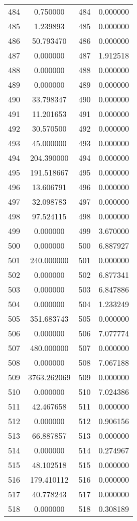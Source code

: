 \documentclass[12pt]{article}
\begin{document}
\begin{longtable}{@{}cccc@{}}
484 & 0.750000 & 484 & 0.000000 \\
485 & 1.239893 & 485 & 0.000000 \\
486 & 50.793470 & 486 & 0.000000 \\
487 & 0.000000 & 487 & 1.912518 \\
488 & 0.000000 & 488 & 0.000000 \\
489 & 0.000000 & 489 & 0.000000 \\
490 & 33.798347 & 490 & 0.000000 \\
491 & 11.201653 & 491 & 0.000000 \\
492 & 30.570500 & 492 & 0.000000 \\
493 & 45.000000 & 493 & 0.000000 \\
494 & 204.390000 & 494 & 0.000000 \\
495 & 191.518667 & 495 & 0.000000 \\
496 & 13.606791 & 496 & 0.000000 \\
497 & 32.098783 & 497 & 0.000000 \\
498 & 97.524115 & 498 & 0.000000 \\
499 & 0.000000 & 499 & 3.670000 \\
500 & 0.000000 & 500 & 6.887927 \\
501 & 240.000000 & 501 & 0.000000 \\
502 & 0.000000 & 502 & 6.877341 \\
503 & 0.000000 & 503 & 6.847886 \\
504 & 0.000000 & 504 & 1.233249 \\
505 & 351.683743 & 505 & 0.000000 \\
506 & 0.000000 & 506 & 7.077774 \\
507 & 480.000000 & 507 & 0.000000 \\
508 & 0.000000 & 508 & 7.067188 \\
509 & 3763.262069 & 509 & 0.000000 \\
510 & 0.000000 & 510 & 7.024386 \\
511 & 42.467658 & 511 & 0.000000 \\
512 & 0.000000 & 512 & 0.906156 \\
513 & 66.887857 & 513 & 0.000000 \\
514 & 0.000000 & 514 & 0.274967 \\
515 & 48.102518 & 515 & 0.000000 \\
516 & 179.410112 & 516 & 0.000000 \\
517 & 40.778243 & 517 & 0.000000 \\
518 & 0.000000 & 518 & 0.308189 \\

\end{longtable}
\end{document}
